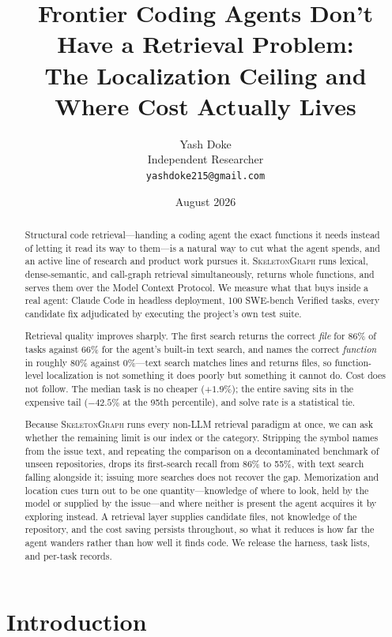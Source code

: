 \documentclass[11pt,letterpaper]{article}
\title{Frontier Coding Agents Don't Have a Retrieval Problem:\\
The Localization Ceiling and Where Cost Actually Lives}
\author{Yash Doke\\Independent Researcher\\\texttt{yashdoke215@gmail.com}}
\date{August 2026}
\newcommand{\sg}{\textsc{SkeletonGraph}}
\begin{document}
\maketitle

\begin{abstract}
Structural code retrieval---handing a coding agent the exact functions it needs
instead of letting it read its way to them---is a natural way to cut what the agent
spends, and an active line of research and product work pursues it. \sg{} runs
lexical, dense-semantic, and call-graph retrieval simultaneously, returns whole
functions, and serves them over the Model Context Protocol. We measure what that
buys inside a real agent: Claude Code in headless deployment, 100 SWE-bench Verified
tasks, every candidate fix adjudicated by executing the project's own test suite.

Retrieval quality improves sharply. The first search returns the correct \emph{file}
for 86\% of tasks against 66\% for the agent's built-in text search, and names the
correct \emph{function} in roughly 80\% against 0\%---text search matches lines and
returns files, so function-level localization is not something it does poorly but
something it cannot do. Cost does not follow. The median task is no cheaper
($+1.9\%$); the entire saving sits in the expensive tail ($-42.5\%$ at the 95th
percentile), and solve rate is a statistical tie.

Because \sg{} runs every non-LLM retrieval paradigm at once, we can ask whether the
remaining limit is our index or the category. Stripping the symbol names from the
issue text, and repeating the comparison on a decontaminated benchmark of unseen
repositories, drops its first-search recall from 86\% to 55\%, with text search
falling alongside it; issuing more searches does not recover the gap. Memorization
and location cues turn out to be one quantity---knowledge of where to look, held by
the model or supplied by the issue---and where neither is present the agent acquires
it by exploring instead. A retrieval layer supplies candidate files, not knowledge of
the repository, and the cost saving persists throughout, so what it reduces is how
far the agent wanders rather than how well it finds code. We release the harness,
task lists, and per-task records.
\end{abstract}

\section{Introduction}
\end{document}
